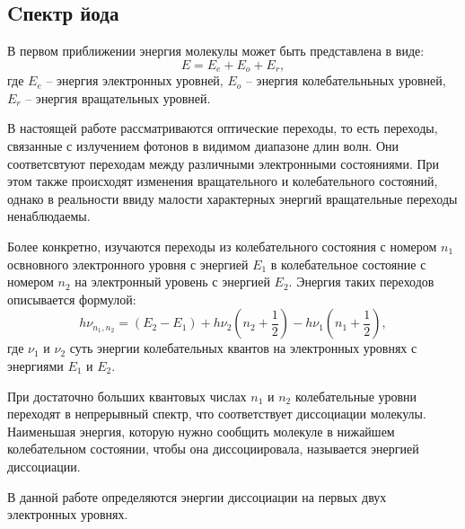         \subsection{Cпектр йода}
        В первом приближении энергия молекулы может быть представлена в виде:
        \begin{equation}
            E=E_e+E_o+E_r,
        \end{equation}
        где $E_e$ -- энергия электронных уровней, $E_o$ -- энергия колебательньных уровней, $E_r$ -- энергия вращательных уровней.

        В настоящей работе рассматриваются оптические переходы, то есть переходы, связанные с излучением фотонов в видимом диапазоне длин волн. Они соответсвтуют переходам между различными электронными состояниями. При этом также происходят изменения вращательного и колебательного состояний, однако в реальности ввиду малости характерных энергий вращательные переходы ненаблюдаемы.

        Более конкретно, изучаются переходы из колебательного состояния с номером $n_1$ освновного электронного уровня с энергией $E_1$ в колебательное состояние с номером $n_2$ на электронный уровень с энергией $E_2$. Энергия таких переходов описывается формулой:
        \begin{equation}
            h \nu_{n_1,n_2}=(E_2-E_1)+h\nu_2(n_2+\dfrac{1}{2})-h \nu_1(n_1+\dfrac{1}{2}),
        \end{equation}
        где $\nu_1$ и $\nu_2$ суть энергии колебательных квантов на электронных уровнях с энергиями $E_1$ и $E_2$.

        При достаточно больших квантовых числах $n_1$ и $n_2$ колебательные уровни переходят в непрерывный спектр, что соответствует диссоциации молекулы. Наименьшая энергия, которую нужно сообщить молекуле в нижайшем колебательном состоянии, чтобы она диссоциировала, называется энергией диссоциации.

        В данной работе определяются энергии диссоциации на первых двух электронных уровнях.
     